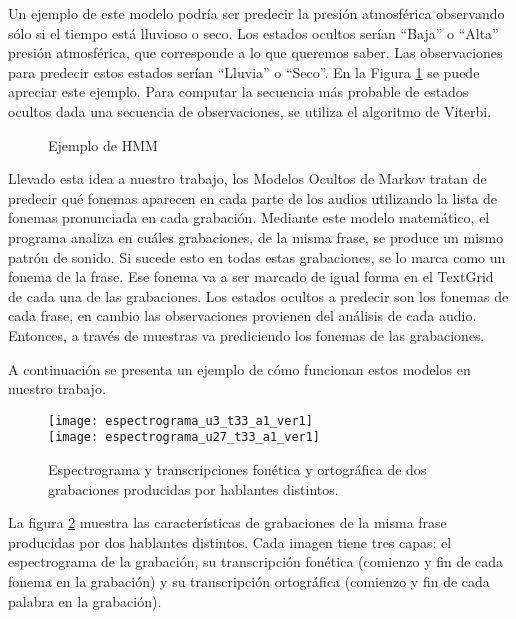 Un ejemplo de este modelo podría ser predecir la presión atmosférica observando sólo si el tiempo está lluvioso o seco. Los estados ocultos serían ``Baja'' o ``Alta'' presión atmosférica, que corresponde a lo que queremos saber. Las observaciones para predecir estos estados serían ``Lluvia'' o ``Seco''. En la Figura \ref{ex_hmm} se puede apreciar este ejemplo. Para computar la secuencia más probable de estados ocultos dada una secuencia de observaciones, se utiliza el algoritmo de Viterbi.

\begin{figure}[htbp]
	\begin{center}
	\end{center}
	\caption{Ejemplo de HMM}
	\label{ex_hmm}
\end{figure}

Llevado esta idea a nuestro trabajo, los Modelos Ocultos de Markov tratan de predecir qué fonemas aparecen en cada parte de los audios utilizando la lista de fonemas pronunciada en cada grabación. Mediante este modelo matemático, el programa analiza en cuáles grabaciones, de la misma frase, se produce un mismo patrón de sonido. Si sucede esto en todas estas grabaciones, se lo marca como un fonema de la frase. Ese fonema va a ser marcado de igual forma en el TextGrid de cada una de las grabaciones. Los estados ocultos a predecir son los fonemas de cada frase, en cambio las observaciones provienen del análisis de cada audio. Entonces, a través de muestras va prediciendo los fonemas de las grabaciones.

A continuación se presenta un ejemplo de cómo funcionan estos modelos en nuestro trabajo. 
%
\begin{figure}[h]
	\centering
	\texttt{[image: espectrograma\_u3\_t33\_a1\_ver1]} \\
	\smallskip
	\texttt{[image: espectrograma\_u27\_t33\_a1\_ver1]} 
	\caption{Espectrograma y transcripciones fonética y ortográfica de dos grabaciones producidas por hablantes distintos.}
	\label{car_a1}
\end{figure}
%
La figura \ref{car_a1} muestra las características de grabaciones de la misma frase producidas por dos hablantes distintos. Cada imagen tiene tres capas: el espectrograma de la grabación, su transcripción fonética (comienzo y fin de cada fonema en la grabación) y su transcripción ortográfica (comienzo y fin de cada palabra en la grabación).

